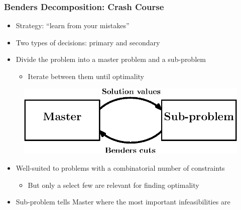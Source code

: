 \documentclass{beamer}
\begin{document}
\begin{frame}
\frametitle{Benders Decomposition: Crash Course}
\begin{itemize}
	\item Strategy: ``learn from your mistakes''\vspace{2mm}\pause
	\item Two types of decisions: {\color{red} primary} and {\color{red} secondary}\vspace{2mm}\pause
	\item Divide the problem into a master problem and a sub-problem \vspace{1mm}
	\begin{itemize}
		\item Iterate between them until optimality
	\end{itemize}
\end{itemize}
\begin{figure}
	\centering
	\includegraphics[height=0.3\textheight]{images/bendersAbstract.eps}
\end{figure}\pause
\begin{itemize}
	\item Well-suited to problems with a combinatorial number of constraints\vspace{1mm}
	\begin{itemize}
		\item But only a select few are relevant for finding optimality\vspace{3mm}\pause
	\end{itemize}
	\item Sub-problem tells Master where the most important infeasibilities are
\end{itemize}
\end{frame}
\end{document}
